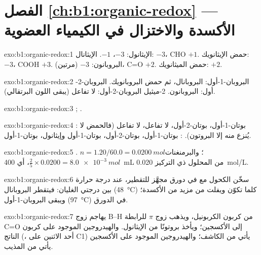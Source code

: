 \section*{الفصل \ref{ch:b1:organic-redox} --- الأكسدة والاختزال في الكيمياء العضوية}

\begin{solution}{exo:b1:organic-redox:1}
الإيثانول:  $-3$،  $-1$. الإيثانال:  $-3$، CHO $+1$.
حمض الإيثانويك:  $-3$، COOH $+3$. البروبانون:  $-3$ (مرتين)،
C=O $+2$. حمض الميثانويك: $+2$.
\end{solution}

\begin{solution}{exo:b1:organic-redox:2}
البروبان-1-أول: البروبانال، ثم حمض البروبانويك. البروبان-2-أول: البروبانون.
2-ميثيل البروبان-2-أول: لا تفاعل (يبقى اللون البرتقالي).
\end{solution}

\begin{solution}{exo:b1:organic-redox:3}
;
.
\end{solution}

\begin{solution}{exo:b1:organic-redox:4}
: بوتان-1-أول، بوتان-2-أول، لا تفاعل، لا تفاعل (فالحمض
لا يُنزع منه إلا البروتون). : بوتان-1-أول، بوتان-2-أول، بوتان-1-أول
وإيثانول، بوتان-1-أول.
\end{solution}

\begin{solution}{exo:b1:organic-redox:5}
.
$n = 1.20/60.0 = \qty{0.0200}{mol}$؛ والبرمنغنات $\frac25 \times 0.0200 =
\qty{8.0e-3}{mol}$، أي \qty{400}{mL} من المحلول ذي التركيز \qty{0.020}{mol/L}.
\end{solution}

\begin{solution}{exo:b1:organic-redox:6}
سخّن الكحول مع  في دورق مجهَّز للتقطير، عند
درجة حرارة بين درجتي الغليان: فيتقطر البروبانال (\qty{48}{\celsius})
كلما تكوّن ويفلت من مزيد من الأكسدة؛ ويبقى البروبان-1-أول
(\qty{97}{\celsius}) في الدورق.
\end{solution}

\begin{solution}{exo:b1:organic-redox:7}
يهاجم زوج B--H من  كربون الكربونيل، ويذهب زوج $\pi$ للرابطة C=O
إلى الأكسجين؛ ويأخذ  بروتونًا من الإيثانول. والهيدروجين
الموجود على كربون الناتج (، أحد الاثنين على C1) يأتي
من الكاشف؛ والهيدروجين الموجود على الأكسجين يأتي من المذيب.
\end{solution}

